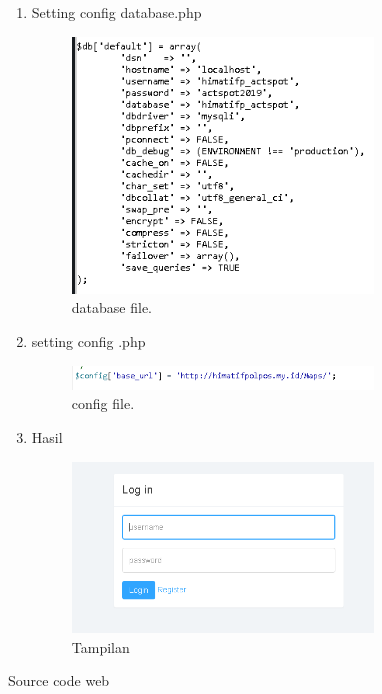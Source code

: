 \begin{itemize}
\begin{enumerate}
	\item Setting config database.php
\begin{figure}[H]
	\includegraphics[width=8cm]{figures/web/4_databasesetting.PNG}
	\centering
	\caption{database file.}
\end{figure}	
	\item setting config .php
\begin{figure}[H]
	\includegraphics[width=8cm]{figures/web/5_config.PNG}
	\centering
	\caption{config file.}
\end{figure}	

	\item Hasil
\begin{figure}[H]
	\includegraphics[width=8cm]{figures/web/6_tampilan.PNG}
	\centering
	\caption{Tampilan}
\end{figure}	
	\end{enumerate}
\end{itemize}


Source code web








